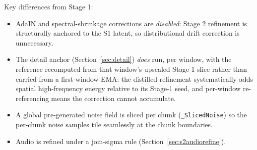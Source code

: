 \documentclass[12pt]{article}
\begin{document}
Key differences from Stage 1:
\begin{itemize}[noitemsep]
\item AdaIN and spectral-shrinkage corrections are \emph{disabled}: Stage 2
  refinement is structurally anchored to the S1 latent, so distributional
  drift correction is unnecessary.
\item The detail anchor (Section~\ref{sec:detail}) \emph{does} run, per
  window, with the reference recomputed from that window's upscaled Stage-1
  slice rather than carried from a first-window EMA: the distilled refinement
  systematically adds spatial high-frequency energy relative to its Stage-1
  seed, and per-window re-referencing means the correction cannot accumulate.
\item A global pre-generated noise field is sliced per chunk
  (\texttt{\_SlicedNoise}) so the per-chunk noise samples tile seamlessly at
  the chunk boundaries.
\item Audio is refined under a join-sigma rule
  (Section~\ref{sec:s2audiorefine}).
\end{itemize}
\end{document}

